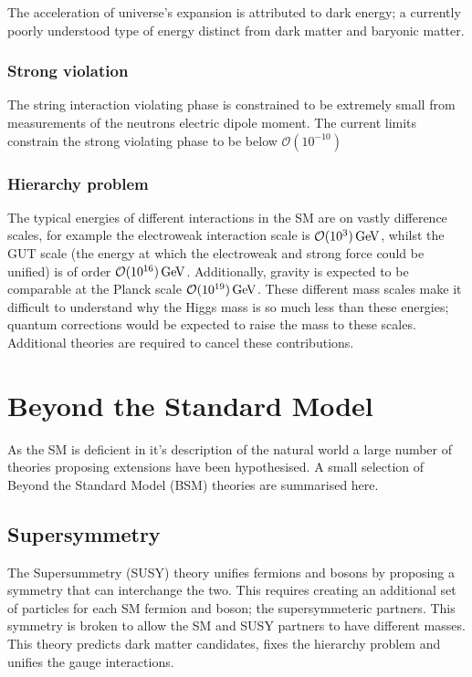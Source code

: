 The acceleration of universe's expansion is attributed to dark energy; a currently poorly understood type of energy distinct from dark matter and baryonic matter.

\subsubsection{Strong \CP violation}  
The string interaction \CP violating phase is constrained to be extremely small from measurements of the neutrons electric dipole moment. The current limits constrain the strong \CP violating phase to be below $\mathcal{O}(10^{-10})$~\cite{Kuckei2007} 

\subsubsection{Hierarchy problem}
The typical energies of different interactions in the SM are on vastly difference scales, for example the electroweak interaction scale is $\mathcal{O}(10^{3})\mathrm{\,Ge\kern -0.1em V}$, whilst the GUT scale (the energy at which the electroweak and strong force could be unified) is of order $\mathcal{O}(10^{16})\mathrm{\,Ge\kern -0.1em V}$. Additionally, gravity is expected to be comparable at the Planck scale $\mathcal{O}(10^{19})\mathrm{\,Ge\kern -0.1em V}$. These different mass scales make it difficult to understand why the Higgs mass is so much less than these energies; quantum corrections would be expected to raise the mass to these scales. Additional theories are required to cancel these contributions. 



\section{Beyond the Standard Model}
As the SM is deficient in it's description of the natural world a large number of theories proposing extensions have been hypothesised.
A small selection of Beyond the Standard Model (BSM) theories are summarised here. 

\subsection{Supersymmetry}

The Supersummetry (SUSY) theory unifies fermions and bosons by proposing a symmetry that can interchange the two. This requires creating an additional set of particles for each SM fermion and boson; the supersymmeteric partners. This symmetry is broken to allow the SM and SUSY partners to have different masses. This theory predicts dark matter candidates, fixes the hierarchy problem and unifies the gauge interactions. 

